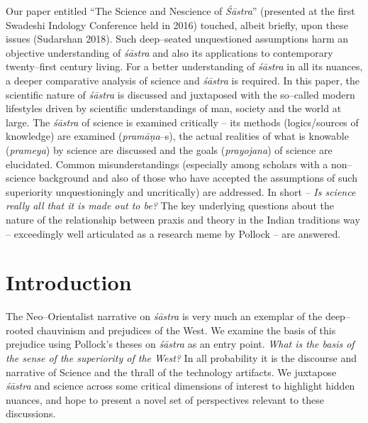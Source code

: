 Our paper entitled “The Science and Nescience of \textit{Śāstra}” (presented at the first Swadeshi Indology Conference held in 2016) touched, albeit briefly, upon these issues (Sudarshan 2018). Such deep–seated unquestioned assumptions harm an objective understanding of \textit{śāstra} and also its applications to contemporary twenty–first century living. For a better understanding of \textit{śāstra} in all its nuances, a deeper comparative analysis of science and \textit{śāstra} is required. In this paper, the scientific nature of \textit{śāstra} is discussed and juxtaposed with the so–called modern lifestyles driven by scientific understandings of man, society and the world at large. The \textit{śāstra} of science is examined critically – its methods (logics/sources of knowledge) are examined (\textit{pramāṇa}–s), the actual realities of what is knowable (\textit{prameya}) by science are discussed and the goals (\textit{prayojana}) of science are elucidated. Common misunderstandings (especially among scholars with a non–science background and also of those who have accepted the assumptions of such superiority unquestioningly and uncritically) are addressed. In short – \textit{Is science really all that it is made out to be?} The key underlying questions about the nature of the relationship between praxis and theory in the Indian traditions way – exceedingly well articulated as a research meme by Pollock – are answered.


\section*{Introduction}

The Neo–Orientalist narrative on \textit{śāstra} is very much an exemplar of the deep–rooted chauvinism and prejudices of the West. We examine the basis of this prejudice using Pollock’s theses on \textit{śāstra} as an entry point. \textit{What is the basis of the sense of the superiority of the West?} In all probability it is the discourse and narrative of Science and the thrall of the technology artifacts. We juxtapose \textit{śāstra} and science across some critical dimensions of interest to highlight hidden nuances, and hope to present a novel set of perspectives relevant to these discussions.

